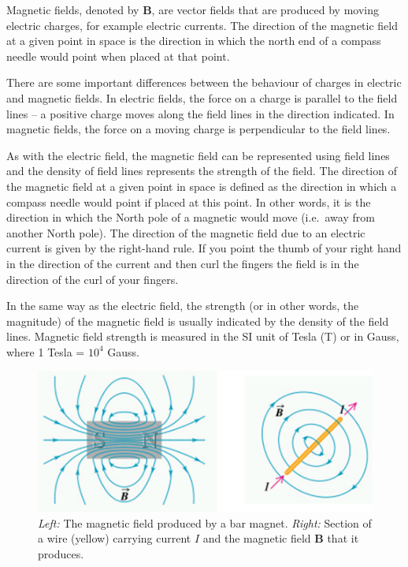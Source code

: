 \documentclass[
  letterpaper,
  DIV=11,
  numbers=noendperiod]{scrreprt}
\begin{document}
Magnetic fields, denoted by \(\mathrm{\mathbf{B}}\), are vector fields
that are produced by moving electric charges, for example electric
currents. The direction of the magnetic field at a given point in space
is the direction in which the north end of a compass needle would point
when placed at that point.

There are some important differences between the behaviour of charges in
electric and magnetic fields. In electric fields, the force on a charge
is parallel to the field lines -- a positive charge moves along the
field lines in the direction indicated. In magnetic fields, the force on
a moving charge is perpendicular to the field lines.

As with the electric field, the magnetic field can be represented using
field lines and the density of field lines represents the strength of
the field. The direction of the magnetic field at a given point in space
is defined as the direction in which a compass needle would point if
placed at this point. In other words, it is the direction in which the
North pole of a magnetic would move (i.e.~away from another North pole).
The direction of the magnetic field due to an electric current is given
by the right-hand rule. If you point the thumb of your right hand in the
direction of the current and then curl the fingers the field is in the
direction of the curl of your fingers.

In the same way as the electric field, the strength (or in other words,
the magnitude) of the magnetic field is usually indicated by the density
of the field lines. Magnetic field strength is measured in the SI unit
of Tesla (T) or in Gauss, where 1 Tesla = \(10^4\) Gauss.

\begin{figure}[H]

{\centering \includegraphics[width=5.20833in,height=\textheight]{Figures/MagFields.png}

}

\caption{\emph{Left:} The magnetic field produced by a bar magnet.
\emph{Right:} Section of a wire (yellow) carrying current \(I\) and the
magnetic field \(\mathrm{\mathbf{B}}\) that it produces.}

\end{figure}%
\end{document}
